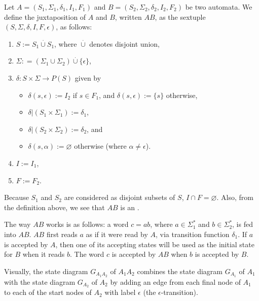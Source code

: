 \documentclass[12pt]{article}
\begin{document}
Let $A=(S_1,\Sigma_1,\delta_1,I_1,F_1)$ and $B=(S_2,\Sigma_2,\delta_2,I_2,F_2)$ be two automata.  We define the juxtaposition of $A$ and $B$, written $AB$, as the sextuple $(S,\Sigma,\delta,I,F,\epsilon)$, as follows:
\begin{enumerate}
\item $S:=S_1\stackrel{\cdot}{\cup} S_1$, where $\stackrel{\cdot}{\cup}$ denotes disjoint union,
\item $\Sigma: = (\Sigma_1\cup \Sigma_2)\stackrel{\cdot}{\cup} \lbrace \epsilon \rbrace$,
\item $\delta:S\times \Sigma\to P(S)$ given by 
\begin{itemize}
\item $\delta(s,\epsilon):=I_2$ if $s\in F_1$, and $\delta(s,\epsilon):=\lbrace s\rbrace$ otherwise,
\item $\delta|(S_1\times \Sigma_1):=\delta_1$, 
\item $\delta|(S_2\times \Sigma_2):=\delta_2$, and  
\item $\delta(s,\alpha):=\varnothing$ otherwise (where $\alpha\ne \epsilon$).
\end{itemize}
\item $I:=I_1$,
\item $F:=F_2$.
\end{enumerate}
Because $S_1$ and $S_2$ are considered as disjoint subsets of $S$, $I\cap F=\varnothing$.  Also, from the definition above, we see that $AB$ is an .

The way $AB$ works is as follows: a word $c=ab$, where $a\in \Sigma_1^*$ and $b\in \Sigma_2^*$, is fed into $AB$.  $AB$ first reads $a$ as if it were read by $A$, via transition function $\delta_1$.  If $a$ is accepted by $A$, then one of its accepting states will be used as the initial state for $B$ when it reads $b$.  The word $c$ is accepted by $AB$ when $b$ is accepted by $B$.

Visually, the state diagram $G_{A_1A_2}$ of $A_1A_2$ combines the state diagram $G_{A_1}$ of $A_1$ with the state diagram $G_{A_2}$ of $A_2$ by adding an edge from each final node of $A_1$ to each of the start nodes of $A_2$ with label $\epsilon$ (the $\epsilon$-transition).
\end{document}
